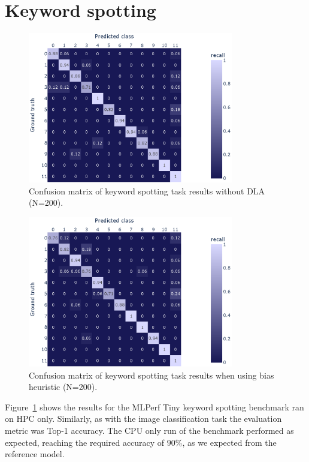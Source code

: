 \documentclass[12pt,a4paper,english
]{tunithesis}
\begin{document}
\section{Keyword spotting}

\begin{figure}[h]
  \centering
  \includegraphics[width=0.8\textwidth]{img/kws_200_no_acc.eps}
  \caption{Confusion matrix of keyword spotting task results without DLA (N=200).}
  \label{fig:kws-results-no-acc}
\end{figure}
\begin{figure}[h]
  \centering
  \includegraphics[width=0.8\textwidth]{img/kws_200_abs_heuristic.eps}
  \caption{Confusion matrix of keyword spotting task results when using bias heuristic (N=200).}
  \label{fig:kws-results}
\end{figure}


\noindent Figure~\ref{fig:kws-results-no-acc} shows the results for the MLPerf Tiny keyword spotting benchmark ran on HPC only. Similarly, as with the image classification task the evaluation metric was Top-1 accuracy. The CPU only run of the benchmark performed as expected, reaching the required accuracy of $90\%$, as we expected from the reference model.
\end{document}

